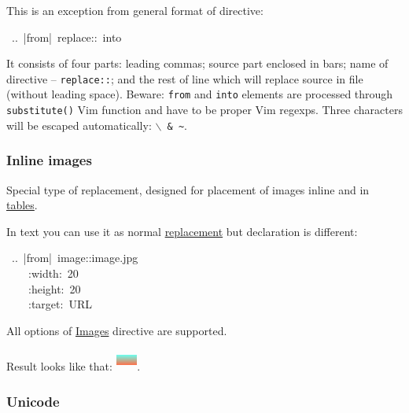 \documentclass[12pt]{article}
\begin{document}
This is an exception from general format of directive:

\begin{ttfamily}\begin{flushleft}
\mbox{~..~|from|~replace::~into}\\
\end{flushleft}\end{ttfamily}

It consists of four parts: leading commas; source part enclosed in
bars; name of directive -- \texttt{replace::}; and the rest of line which will
replace source in file (without leading space). Beware: \texttt{from} and \texttt{into}
elements are processed through \texttt{substitute()} Vim function and have to be
proper Vim regexps. Three characters will be escaped automatically: \texttt{$\backslash$ \& \~{}}.

\hypertarget{linline-images}{}
\subsubsection{Inline images}

Special type of replacement, designed for placement of images inline and
in \href{\#ltables}{tables}.

In text you can use it as normal \href{\#lreplacement}{replacement} but declaration is
different:

\begin{ttfamily}\begin{flushleft}
\mbox{~..~|from|~image::image.jpg}\\
\mbox{~~~~:width:~20~}\\
\mbox{~~~~:height:~20~}\\
\mbox{~~~~:target:~URL}\\
\end{flushleft}\end{ttfamily}

All options of \href{\#limages}{Images} directive are supported.

Result looks like that: \href{test.png}{\includegraphics[height=20pt, width=20pt]{test.png}}.

\hypertarget{lunicode}{}
\subsubsection{Unicode}
\end{document}
